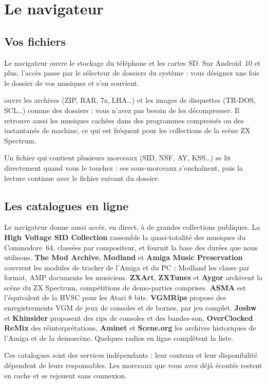 \chapter{Le navigateur}

\section{Vos fichiers}
Le navigateur ouvre le stockage du téléphone et les cartes SD. Sur Android~10 et plus, l'accès passe par le
sélecteur de dossiers du système : vous désignez une fois le dossier de vos musiques et \soft s'en souvient.

\soft ouvre les archives (ZIP, RAR, 7z, LHA\dots) et les images de disquettes (TR-DOS, SCL\dots) comme des dossiers :
vous n'avez pas besoin de les décompresser. Il retrouve aussi les musiques cachées dans des programmes compressés ou
des instantanés de machine, ce qui est fréquent pour les collections de la scène ZX Spectrum.

Un fichier qui contient plusieurs morceaux (SID, NSF, AY, KSS\dots) se lit directement quand vous le touchez : ses
sous-morceaux s'enchaînent, puis la lecture continue avec le fichier suivant du dossier.

\section{Les catalogues en ligne}
Le navigateur donne aussi accès, en direct, à de grandes collections publiques. La \textbf{High Voltage SID
Collection} rassemble la quasi-totalité des musiques du Commodore~64, classées par compositeur, et fournit la base
des durées que nous utilisons. \textbf{The Mod Archive}, \textbf{Modland} et \textbf{Amiga Music Preservation}
couvrent les modules de tracker de l'Amiga et du PC ; Modland les classe par format, AMP documente les musiciens.
\textbf{ZXArt}, \textbf{ZXTunes} et \textbf{Aygor} archivent la scène du ZX Spectrum, compétitions de demo-parties
comprises. \textbf{ASMA} est l'équivalent de la HVSC pour les Atari 8 bits. \textbf{VGMRips} propose des
enregistrements VGM de jeux de consoles et de bornes, par jeu complet. \textbf{Joshw} et \textbf{Khinsider}
proposent des rips de consoles et des bandes-son, \textbf{OverClocked ReMix} des réinterprétations, \textbf{Aminet}
et \textbf{Scene.org} les archives historiques de l'Amiga et de la demoscène. Quelques radios en ligne complètent
la liste.

Ces catalogues sont des services indépendants : leur contenu et leur disponibilité dépendent de leurs responsables.
Les morceaux que vous avez déjà écoutés restent en cache et se rejouent sans connexion.


